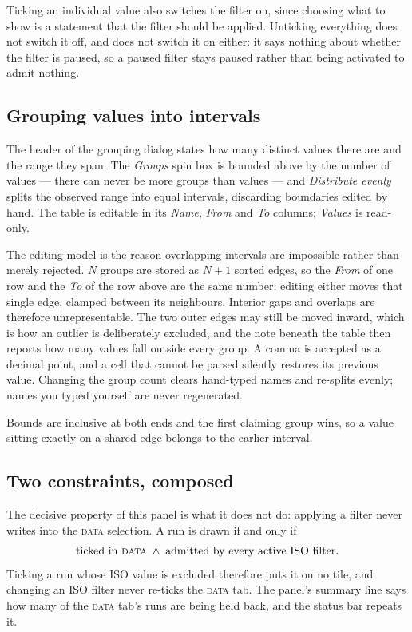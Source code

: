 \documentclass[11pt,a4paper,oneside]{report}
\newcommand{\tab}[1]{\textsc{#1}}
\begin{document}
Ticking an individual value also switches the filter on, since choosing what to
show is a statement that the filter should be applied. Unticking everything does
not switch it off, and does not switch it on either: it says nothing about
whether the filter is paused, so a paused filter stays paused rather than being
activated to admit nothing.

\subsection{Grouping values into intervals}

The header of the grouping dialog states how many distinct values there are and
the range they span. The \emph{Groups} spin box is bounded above by the number of
values --- there can never be more groups than values --- and \emph{Distribute
evenly} splits the observed range into equal intervals, discarding boundaries
edited by hand. The table is editable in its \emph{Name}, \emph{From} and
\emph{To} columns; \emph{Values} is read-only.

The editing model is the reason overlapping intervals are impossible rather than
merely rejected. $N$ groups are stored as $N+1$ sorted edges, so the \emph{From}
of one row and the \emph{To} of the row above are the same number; editing either
moves that single edge, clamped between its neighbours. Interior gaps and
overlaps are therefore unrepresentable. The two outer edges may still be moved
inward, which is how an outlier is deliberately excluded, and the note beneath
the table then reports how many values fall outside every group. A comma is
accepted as a decimal point, and a cell that cannot be parsed silently restores
its previous value. Changing the group count clears hand-typed names and
re-splits evenly; names you typed yourself are never regenerated.

Bounds are inclusive at both ends and the first claiming group wins, so a value
sitting exactly on a shared edge belongs to the earlier interval.

\subsection{Two constraints, composed}

The decisive property of this panel is what it does not do: applying a filter
never writes into the \tab{data} selection. A run is drawn if and only if
\[
  \text{ticked in \tab{data}} \;\wedge\; \text{admitted by every active ISO filter.}
\]
Ticking a run whose ISO value is excluded therefore puts it on no tile, and
changing an ISO filter never re-ticks the \tab{data} tab. The panel's summary
line says how many of the \tab{data} tab's runs are being held back, and the
status bar repeats it.
\end{document}
